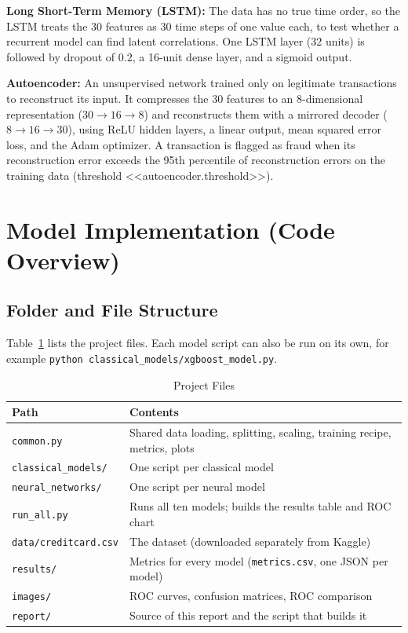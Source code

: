 \documentclass[journal]{IEEEtran}
\begin{document}
\textbf{Long Short-Term Memory (LSTM):} The data has no true time order, so the LSTM treats the 30 features as 30 time steps of one value each, to test whether a recurrent model can find latent correlations. One LSTM layer (32 units) is followed by dropout of 0.2, a 16-unit dense layer, and a sigmoid output.

\textbf{Autoencoder:} An unsupervised network trained only on legitimate transactions to reconstruct its input. It compresses the 30 features to an 8-dimensional representation ($30 \rightarrow 16 \rightarrow 8$) and reconstructs them with a mirrored decoder ($8 \rightarrow 16 \rightarrow 30$), using ReLU hidden layers, a linear output, mean squared error loss, and the Adam optimizer. A transaction is flagged as fraud when its reconstruction error exceeds the 95th percentile of reconstruction errors on the training data (threshold <<autoencoder.threshold>>).

\section{Model Implementation (Code Overview)}
\subsection{Folder and File Structure}
Table~\ref{tab:files} lists the project files. Each model script can also be run on its own, for example \texttt{python classical\_models/xgboost\_model.py}.

\begin{table}[!t]
\centering
\caption{Project Files}
\label{tab:files}
\footnotesize
\begin{tabular}{@{}p{}p{}@{}}
\toprule
Path & Contents \\
\midrule
\texttt{common.py} & Shared data loading, splitting, scaling, training recipe, metrics, plots \\
\texttt{classical\_models/} & One script per classical model \\
\texttt{neural\_networks/} & One script per neural model \\
\texttt{run\_all.py} & Runs all ten models; builds the results table and ROC chart \\
\texttt{data/creditcard.csv} & The dataset (downloaded separately from Kaggle) \\
\texttt{results/} & Metrics for every model (\texttt{metrics.csv}, one JSON per model) \\
\texttt{images/} & ROC curves, confusion matrices, ROC comparison \\
\texttt{report/} & Source of this report and the script that builds it \\
\bottomrule
\end{tabular}
\end{table}
\end{document}

